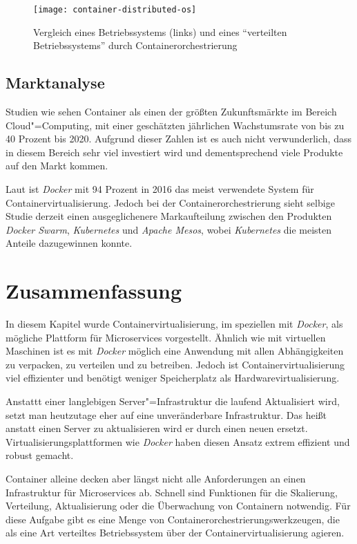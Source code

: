 \begin{figure}[!hbt]%
\centering
\texttt{[image: container-distributed-os]}%
\caption{Vergleich eines Betriebssystems (links) und eines "`verteilten Betriebssystems"' durch Containerorchestrierung}%
\label{fig:container-distributed-os}%
\end{figure}

\subsection{Marktanalyse}

Studien wie \cite{ContainerMarketGrowth} sehen Container als einen der größten Zukunftsmärkte im Bereich Cloud"=Computing, mit einer geschätzten jährlichen Wachstumsrate von bis zu 40 Prozent bis 2020. Aufgrund dieser Zahlen ist es auch nicht verwunderlich, dass in diesem Bereich sehr viel investiert wird und dementsprechend viele Produkte auf den Markt kommen. 

Laut \cite{ContainerMarketReport} ist \textit{Docker} mit 94 Prozent in 2016 das meist verwendete System für Containervirtualisierung. Jedoch bei der Containerorchestrierung sieht selbige Studie derzeit einen ausgeglichenere Markaufteilung zwischen den Produkten \textit{Docker Swarm}, \textit{Kubernetes} und \textit{Apache Mesos}, wobei \textit{Kubernetes} die meisten Anteile dazugewinnen konnte.

\section{Zusammenfassung}

In diesem Kapitel wurde Containervirtualisierung, im speziellen mit \textit{Docker}, als mögliche Plattform für Microservices vorgestellt. Ähnlich wie mit virtuellen Maschinen ist es mit \textit{Docker} möglich eine Anwendung mit allen Abhängigkeiten zu verpacken, zu verteilen und zu betreiben. Jedoch ist Containervirtualisierung viel effizienter und benötigt weniger Speicherplatz als Hardwarevirtualisierung.

Anstattt einer langlebigen Server"=Infrastruktur die laufend Aktualisiert wird, setzt man heutzutage eher auf eine unveränderbare Infrastruktur. Das heißt anstatt einen Server zu aktualisieren wird er durch einen neuen ersetzt. Virtualisierungsplattformen wie \textit{Docker} haben diesen Ansatz extrem effizient und robust gemacht.

Container alleine decken aber längst nicht alle Anforderungen an einen Infrastruktur für Microservices ab. Schnell sind Funktionen für die Skalierung, Verteilung, Aktualisierung oder die Überwachung von Containern notwendig. Für diese Aufgabe gibt es eine Menge von Containerorchestrierungswerkzeugen, die als eine Art verteiltes Betriebssystem über der Containervirtualisierung agieren.

